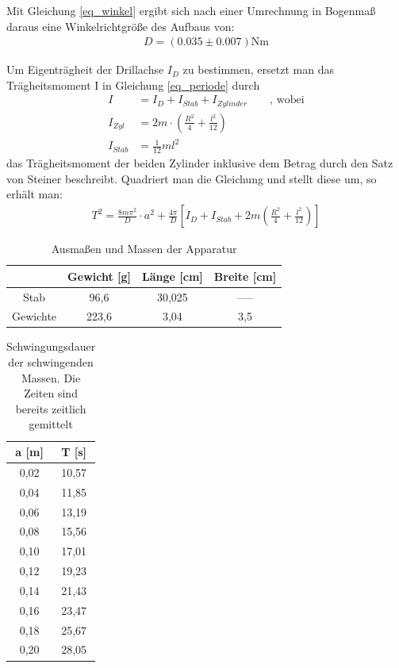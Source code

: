 Mit Gleichung \eqref{eq_winkel} ergibt sich nach einer Umrechnung in Bogenmaß daraus eine Winkelrichtgröße des Aufbaus von:
\begin{align*}
D=(0.035 \pm 0.007) \text{Nm}
\end{align*}


Um Eigenträgheit der Drillachse $I_D$ zu bestimmen, ersetzt man das Trägheitsmoment I in Gleichung \eqref{eq_periode} durch
\begin{align*}
I&=I_D+I_{Stab}+I_{Zylinder} \qquad \text{, wobei}\\
I_{Zyl}&=2m\cdot\left(\frac{R^2}{4}+\frac{l^2}{12}\right)\\
I_{Stab}&= \frac{1}{12}ml^2
\end{align*}
das Trägheitsmoment der beiden Zylinder inklusive dem Betrag durch den Satz von Steiner beschreibt.
Quadriert man die Gleichung und stellt diese um, so erhält man:
\begin{align}
T^2=\frac{8m\pi^2}{D}\cdot a^2 + \frac{4\pi}{D}  \left[  I_D+I_{Stab}+2m\left(\frac{R^2}{4}+\frac{l^2}{12}\right)\right]
\end{align}

\begin{table}[htbp]
\begin{tabular}{|c|c|c|c|}
\hline 
 & Gewicht [g] & Länge [cm] & Breite [cm] \\ 
\hline 
Stab & 96,6 & 30,025 & ----- \\ 
\hline 
Gewichte & 223,6 & 3,04 & 3,5 \\ 
\hline 
\end{tabular}\newline
\caption{Ausmaßen und Massen der Apparatur}
\end{table}

\begin{table}[htbp]
\begin{tabular}{|c|c|}
\hline
a [m] &	T [s]\\ \hline
0,02&	10,57\\ \hline
0,04&	11,85\\ \hline
0,06&	13,19\\ \hline
0,08&	15,56\\ \hline
0,10&	17,01\\ \hline
0,12&	19,23\\ \hline
0,14&	21,43\\ \hline
0,16&	23,47\\ \hline
0,18&	25,67\\ \hline
0,20&	28,05\\ \hline
\end{tabular} 
\caption{Schwingungsdauer der schwingenden Massen. Die Zeiten sind bereits zeitlich gemittelt}
\end{table}

